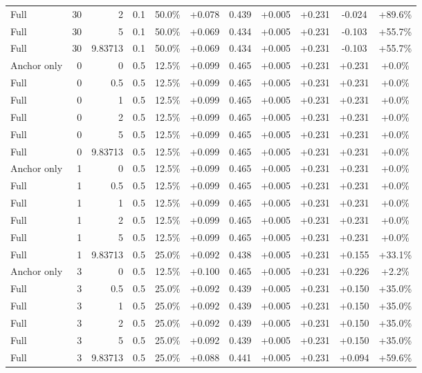 \begin{table}[htbp]
\begin{tabular}{lrrrccccccc}
Full & 30 & 2 & 0.1 & 50.0\% & +0.078 & 0.439 & +0.005 & +0.231 & -0.024 & +89.6\% \\
Full & 30 & 5 & 0.1 & 50.0\% & +0.069 & 0.434 & +0.005 & +0.231 & -0.103 & +55.7\% \\
Full & 30 & 9.83713 & 0.1 & 50.0\% & +0.069 & 0.434 & +0.005 & +0.231 & -0.103 & +55.7\% \\
Anchor only & 0 & 0 & 0.5 & 12.5\% & +0.099 & 0.465 & +0.005 & +0.231 & +0.231 & +0.0\% \\
Full & 0 & 0.5 & 0.5 & 12.5\% & +0.099 & 0.465 & +0.005 & +0.231 & +0.231 & +0.0\% \\
Full & 0 & 1 & 0.5 & 12.5\% & +0.099 & 0.465 & +0.005 & +0.231 & +0.231 & +0.0\% \\
Full & 0 & 2 & 0.5 & 12.5\% & +0.099 & 0.465 & +0.005 & +0.231 & +0.231 & +0.0\% \\
Full & 0 & 5 & 0.5 & 12.5\% & +0.099 & 0.465 & +0.005 & +0.231 & +0.231 & +0.0\% \\
Full & 0 & 9.83713 & 0.5 & 12.5\% & +0.099 & 0.465 & +0.005 & +0.231 & +0.231 & +0.0\% \\
Anchor only & 1 & 0 & 0.5 & 12.5\% & +0.099 & 0.465 & +0.005 & +0.231 & +0.231 & +0.0\% \\
Full & 1 & 0.5 & 0.5 & 12.5\% & +0.099 & 0.465 & +0.005 & +0.231 & +0.231 & +0.0\% \\
Full & 1 & 1 & 0.5 & 12.5\% & +0.099 & 0.465 & +0.005 & +0.231 & +0.231 & +0.0\% \\
Full & 1 & 2 & 0.5 & 12.5\% & +0.099 & 0.465 & +0.005 & +0.231 & +0.231 & +0.0\% \\
Full & 1 & 5 & 0.5 & 12.5\% & +0.099 & 0.465 & +0.005 & +0.231 & +0.231 & +0.0\% \\
Full & 1 & 9.83713 & 0.5 & 25.0\% & +0.092 & 0.438 & +0.005 & +0.231 & +0.155 & +33.1\% \\
Anchor only & 3 & 0 & 0.5 & 12.5\% & +0.100 & 0.465 & +0.005 & +0.231 & +0.226 & +2.2\% \\
Full & 3 & 0.5 & 0.5 & 25.0\% & +0.092 & 0.439 & +0.005 & +0.231 & +0.150 & +35.0\% \\
Full & 3 & 1 & 0.5 & 25.0\% & +0.092 & 0.439 & +0.005 & +0.231 & +0.150 & +35.0\% \\
Full & 3 & 2 & 0.5 & 25.0\% & +0.092 & 0.439 & +0.005 & +0.231 & +0.150 & +35.0\% \\
Full & 3 & 5 & 0.5 & 25.0\% & +0.092 & 0.439 & +0.005 & +0.231 & +0.150 & +35.0\% \\
Full & 3 & 9.83713 & 0.5 & 25.0\% & +0.088 & 0.441 & +0.005 & +0.231 & +0.094 & +59.6\% \\

\end{tabular}
\end{table}
